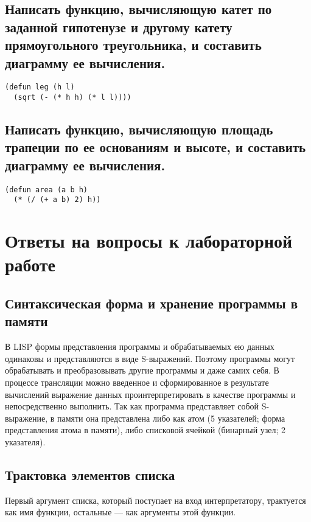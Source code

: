 \clearpage

\section{Написать функцию, вычисляющую катет по заданной гипотенузе и другому катету прямоугольного треугольника, и составить диаграмму ее вычисления.}

\begin{lstlisting}
(defun leg (h l)
  (sqrt (- (* h h) (* l l))))
\end{lstlisting}

\vspace{60mm}

\section{Написать функцию, вычисляющую площадь трапеции по ее основаниям и высоте, и составить диаграмму ее вычисления.}

\begin{lstlisting}
(defun area (a b h) 
  (* (/ (+ a b) 2) h))
\end{lstlisting}

\chapter{Ответы на вопросы к лабораторной работе}

\section{Синтаксическая форма и хранение программы в памяти}

В LISP формы представления программы и обрабатываемых ею данных одинаковы и представляются в виде S-выражений. Поэтому программы могут обрабатывать и преобразовывать другие программы и даже самих себя. В процессе трансляции можно введенное и сформированное в результате вычислений выражение данных проинтерпретировать в качестве программы и непосредственно выполнить. Так как программа представляет собой S-выражение, в памяти она представлена либо как атом (5 указателей; форма представления атома в памяти), либо списковой ячейкой (бинарный узел; 2 указателя).

\section{Трактовка элементов списка}

Первый аргумент списка, который поступает на вход интерпретатору, трактуется как имя функции, остальные --- как аргументы этой функции.

